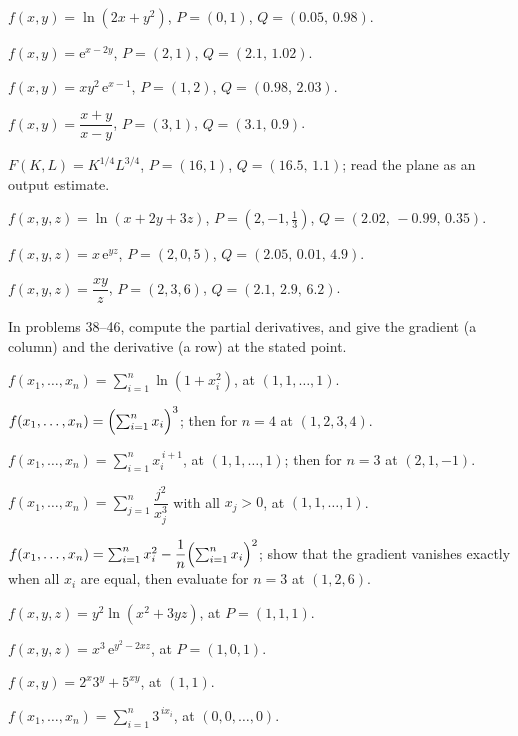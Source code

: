 \begin{problems}[resume]
  \item $f(x,y)=\ln(2x+y^{2})$, \;$P=(0,1)$, \;$Q=(0.05,\,0.98)$.
  \item $f(x,y)=\mathrm{e}^{x-2y}$, \;$P=(2,1)$, \;$Q=(2.1,\,1.02)$.
  \item $f(x,y)=xy^{2}\,\mathrm{e}^{x-1}$, \;$P=(1,2)$,
        \;$Q=(0.98,\,2.03)$.
  \item $f(x,y)=\dfrac{x+y}{x-y}$, \;$P=(3,1)$, \;$Q=(3.1,\,0.9)$.
  \item $F(K,L)=K^{1/4}L^{3/4}$, \;$P=(16,1)$, \;$Q=(16.5,\,1.1)$; read
        the plane as an output estimate.
  \item $f(x,y,z)=\ln(x+2y+3z)$, \;$P=(2,-1,\tfrac13)$,
        \;$Q=(2.02,\,-0.99,\,0.35)$.
  \item $f(x,y,z)=x\,\mathrm{e}^{yz}$, \;$P=(2,0,5)$,
        \;$Q=(2.05,\,0.01,\,4.9)$.
  \item $f(x,y,z)=\dfrac{xy}{z}$, \;$P=(2,3,6)$, \;$Q=(2.1,\,2.9,\,6.2)$.
\end{problems}

In problems 38--46, compute the partial derivatives, and give the gradient
(a column) and the derivative (a row) at the stated point.

\begin{problems}[resume]
  \item $f(x_{1},\ldots,x_{n})=\sum_{i=1}^{n}\ln(1+x_{i}^{2})$, at
        $(1,1,\ldots,1)$.
  \item $f(x_{1},\ldots,x_{n})=\Bigl(\sum_{i=1}^{n}x_{i}\Bigr)^{3}$; then
        for $n=4$ at $(1,2,3,4)$.
  \item $f(x_{1},\ldots,x_{n})=\sum_{i=1}^{n}x_{i}^{\,i+1}$, at
        $(1,1,\ldots,1)$; then for $n=3$ at $(2,1,-1)$.
  \item $f(x_{1},\ldots,x_{n})=\sum_{j=1}^{n}\dfrac{j^{2}}{x_{j}^{3}}$ with
        all $x_{j}>0$, at $(1,1,\ldots,1)$.
  \item $f(x_{1},\ldots,x_{n})=\sum_{i=1}^{n}x_{i}^{2}
        -\dfrac1n\Bigl(\sum_{i=1}^{n}x_{i}\Bigr)^{2}$; show that the
        gradient vanishes exactly when all $x_{i}$ are equal, then evaluate
        for $n=3$ at $(1,2,6)$.
  \item $f(x,y,z)=y^{2}\ln(x^{2}+3yz)$, at $P=(1,1,1)$.
  \item $f(x,y,z)=x^{3}\,\mathrm{e}^{y^{2}-2xz}$, at $P=(1,0,1)$.
  \item $f(x,y)=2^{x}3^{y}+5^{xy}$, at $(1,1)$.
  \item $f(x_{1},\ldots,x_{n})=\sum_{i=1}^{n}3^{\,i x_{i}}$, at
        $(0,0,\ldots,0)$.
\end{problems}

